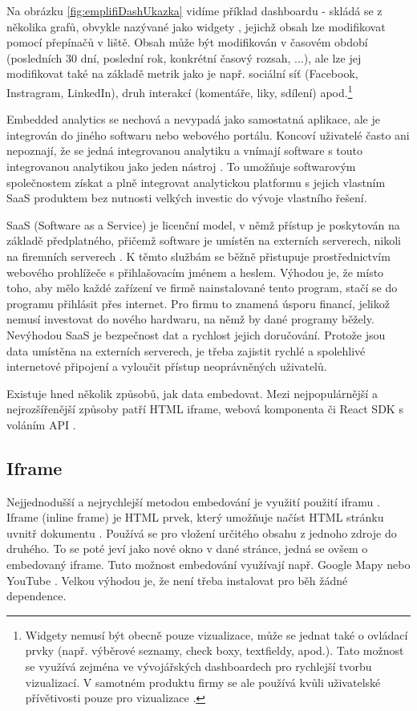 \documentclass[czech, bc, kiv, he, iso690numb]{fasthesis}
\begin{document}
Na obrázku \ref{fig:emplifiDashUkazka} vidíme příklad dashboardu - skládá se z několika grafů, obvykle nazývané jako widgety \cite{emplifiDashboard}, jejichž obsah lze modifikovat pomocí přepínačů v liště. Obsah může být modifikován v časovém období (posledních 30 dní, poslední rok, konkrétní časový rozsah, ...), ale lze jej modifikovat také na základě metrik jako je např. sociální síť (Facebook, Instragram, LinkedIn), druh interakcí (komentáře, liky, sdílení) apod.\footnote{Widgety nemusí být obecně pouze vizualizace, může se jednat také o ovládací prvky (např. výběrové seznamy, check boxy, textfieldy, apod.). Tato možnost se využívá zejména ve vývojářských dashboardech pro rychlejší tvorbu vizualizací. V samotném produktu firmy se ale používá kvůli uživatelské přívětivosti pouze pro vizualizace \cite{emplifiDashboard}. 
}

Embedded analytics se nechová a nevypadá jako samostatná aplikace, ale je integrován do jiného softwaru nebo webového portálu. Koncoví uživatelé často ani nepoznají, že se jedná
integrovanou analytiku a vnímají software s touto integrovanou analytikou jako jeden nástroj \cite{goodDataEmbedded}. To umožňuje softwarovým společnostem získat a plně
integrovat analytickou platformu s jejich vlastním SaaS produktem bez nutnosti velkých investic do vývoje vlastního řešení. 

SaaS (Software as a Service) je licenční model, v němž přístup je poskytován na základě předplatného, přičemž software je umístěn na externích serverech, nikoli na firemních serverech \cite{saasDefinition}.
K těmto službám se běžně přistupuje prostřednictvím webového prohlížeče s přihlašovacím jménem a heslem. Výhodou je, že místo toho, aby mělo každé zařízení ve firmě nainstalované
tento program, stačí se do programu přihlásit přes internet. Pro firmu to znamená úsporu financí, jelikož nemusí investovat do nového hardwaru, na němž by dané programy běžely. 
Nevýhodou SaaS je bezpečnost dat a rychlost jejich doručování. Protože jsou data umístěna na externích serverech, je třeba zajistit rychlé a spolehlivé internetové připojení a vyloučit
přístup neoprávněných uživatelů.

Existuje hned několik způsobů, jak data embedovat. Mezi nejpopulárnější a nejrozšířenější způsoby patří HTML iframe, webová komponenta či React SDK s voláním API \cite{goodDataEmbedded}. 

\subsection{Iframe}
Nejjednodušší a nejrychlejší metodou embedování je využití použití iframu \cite{goodDataEmbedded}. Iframe (inline frame) je HTML prvek, který umožňuje načíst HTML stránku uvnitř dokumentu \cite{iFrameAdv}. Používá se pro vložení určitého obsahu z jednoho zdroje do druhého. To se poté jeví jako nové okno v dané stránce, jedná se ovšem o embedovaný iframe. Tuto možnost embedování využívají např. Google Mapy nebo YouTube \cite{iFrameAdv}. Velkou výhodou je, že není třeba instalovat pro běh žádné dependence.
\end{document}
